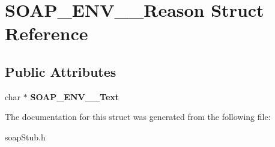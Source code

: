 \hypertarget{structSOAP__ENV____Reason}{
\section{SOAP\_\-ENV\_\-\_\-Reason Struct Reference}
\label{structSOAP__ENV____Reason}
}
\subsection*{Public Attributes}
\begin{DoxyCompactItemize}
\item 
\hypertarget{structSOAP__ENV____Reason_a4e7a5850ce6987bf6d15bf9fea780ecd}{
char $\ast$ {\bfseries SOAP\_\-ENV\_\-\_\-Text}}
\label{structSOAP__ENV____Reason_a4e7a5850ce6987bf6d15bf9fea780ecd}

\end{DoxyCompactItemize}


The documentation for this struct was generated from the following file:\begin{DoxyCompactItemize}
\item 
soapStub.h\end{DoxyCompactItemize}
